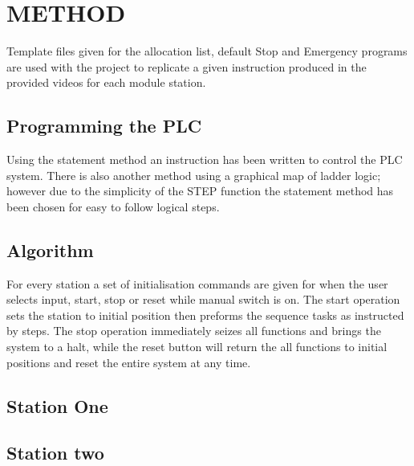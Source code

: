 \documentclass[a4paper, 10pt,  conference]{article}
\begin{document}

\section{METHOD}
Template files given for the allocation list, default Stop and Emergency programs are used with the project to replicate a given instruction produced in the provided videos for each module station.



\subsection{Programming the PLC}
Using the statement method an instruction has been written to control the PLC system. There is also another method using a graphical map of ladder logic; however due to the simplicity of the STEP function the statement method has been chosen for easy to follow logical steps.



\subsection{Algorithm}
For every station a set of initialisation commands are given for when the user selects input, start, stop or reset while manual switch is on. The start operation sets the station to initial position then preforms the sequence tasks as instructed by steps. The stop operation immediately seizes all functions and brings the system to a halt, while the reset button will return the all functions to initial positions and reset the entire system at any time.



\subsection{Station One}





\subsection{Station two}
\end{document}
